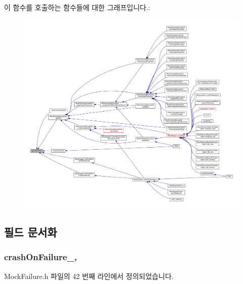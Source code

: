 이 함수를 호출하는 함수들에 대한 그래프입니다.\+:
\nopagebreak
\begin{figure}[H]
\begin{center}
\leavevmode
\includegraphics[width=350pt]{class_mock_failure_reporter_ae3f75fac53b4d3395e02ee8eca858422_icgraph}
\end{center}
\end{figure}




\subsection{필드 문서화}
\subsubsection[{\texorpdfstring{crash\+On\+Failure\+\_\+}{crashOnFailure_}}]{ crash\+On\+Failure\+\_\+\hspace{0.3cm}{\ttfamily [protected]}, {\ttfamily [inherited]}}\hypertarget{class_mock_failure_reporter_a9faf961cbe6687577f4eaae4625bcbea}{}\label{class_mock_failure_reporter_a9faf961cbe6687577f4eaae4625bcbea}


Mock\+Failure.\+h 파일의 42 번째 라인에서 정의되었습니다.

